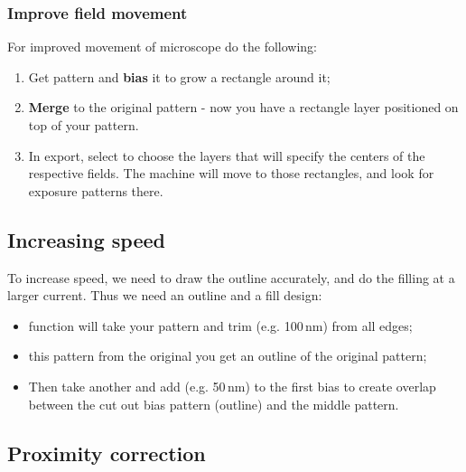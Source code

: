   \subsubsection{Improve field movement}
  \label{sec:impr-field-movem}
  For improved movement of microscope do the following:
  \begin{enumerate}
  \item Get pattern and \textbf{bias} it to grow a rectangle around it;
  \item \textbf{Merge} to the original pattern -  now you have a rectangle layer positioned on
    top of your pattern.
  \item In export,  select  to choose the layers  that will specify
    the centers of the respective fields.  The machine will move to those rectangles, and look
    for exposure patterns there.
  \end{enumerate}

 \subsection{Increasing speed}
 To increase  speed, we need to  draw the outline accurately,  and do the filling  at a larger
 current. Thus we need an outline and a fill design:
  
 \begin{itemize}
 \item {} function will take your pattern and trim (e.g. 100\,nm) from all edges;
 \item {}  this pattern  from the  original \ra you  get an  outline of  the original
   pattern;
 \item Then take another  and add (e.g.  50\,nm) to the first bias to create overlap
   between the cut out bias pattern (outline) and the middle pattern.  
 \end{itemize}

 \subsection{Proximity correction}
 
